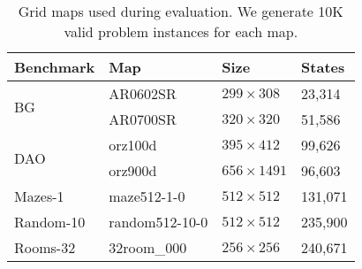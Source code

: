 \begin{table}[tb]
\begin{center}
\begin{tabular}{|l|l|l|l|}
\hline
\textbf{Benchmark}& \textbf{Map} & \textbf{Size} & \textbf{States} \\
\hline
\multirow{2}{*}{BG} & AR0602SR & $299\times308$ & 23,314  \\
 & AR0700SR & $320 \times 320$ & 51,586  \\
\hline
\multirow{2}{*}{DAO} & orz100d &  $395 \times 412 $ & 99,626\\
 & orz900d & $656 \times 1491$ &  96,603 \\ 
\hline
Mazes-1 & maze512-1-0 & $ 512 \times 512$ & 131,071  \\
\hline
Random-10 & random512-10-0 & $ 512 \times 512$  &  235,900\\
\hline
Rooms-32 & 32room\_000 & $256 \times 256 $ & 240,671\\
\hline
\end{tabular}
\end{center}
\caption{Grid maps used during evaluation. We generate 10K valid problem
instances for each map. }
\label{table:benchmarks}
\end{table}
